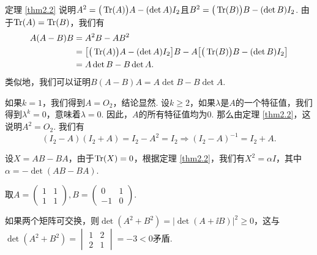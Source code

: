 \begin{solution}
  定理 \ref{thm2.2} 说明$A^2 = \big(\operatorname{Tr}(A)\big)A - (\det A)I_2$且$B^2= \big(\operatorname{Tr}(B)\big)B - (\det B)I_2$. 由于$\operatorname{Tr}(A)=\operatorname{Tr}(B)$，我们有
  \begin{align*}
    A(A-B)B & = A^2B - AB^2 \\
    & = \big[ \big(\operatorname{Tr}(A)\big)A - (\det A)I_2\big]B - A\big[ \big(\operatorname{Tr}(B)\big)B - (\det B)I_2\big] \\
    & = A\det B - B\det A.
  \end{align*}
  类似地，我们可以证明$B(A-B)A=A\det B-B\det A$.
\end{solution}

\begin{solution}
  如果$k=1$，我们得到$A=O_2$，结论显然. 设$k\ge2$，如果$\lambda$是$A$的一个特征值，我们得到$\lambda^k=0$，意味着$\lambda=0$. 因此，$A$的所有特征值均为0. 那么由定理 \ref{thm2.2}，这说明$A^2=O_2$. 我们有
  \[
    (I_2 - A)(I_2 + A) = I_2 - A^2 = I_2 \Rightarrow (I_2 - A)^{-1} = I_2 + A.
  \]
\end{solution}

\begin{solution}
  设$X=AB-BA$，由于$\operatorname{Tr}(X)=0$，根据定理 \ref{thm2.2}，我们有$X^2=\alpha I$，其中$\alpha=-\det(AB-BA)$.
\end{solution}

\begin{solution}
  \begin{inparaenum}[(a)]
    \item 取$A=\begin{pmatrix}
      1 & 1 \\
      1 & 1
    \end{pmatrix},B=\begin{pmatrix}
      0 & 1 \\
      -1 & 0
    \end{pmatrix}$.

  \item 如果两个矩阵可交换，则$\det(A^2+B^2)=|\det(A+\ii B)|^2\ge0$，这与$\det(A^2+B^2)=\begin{vmatrix}
        1 & 2\\
        2 & 1
      \end{vmatrix}=-3<0$矛盾.
  \end{inparaenum}
\end{solution}




